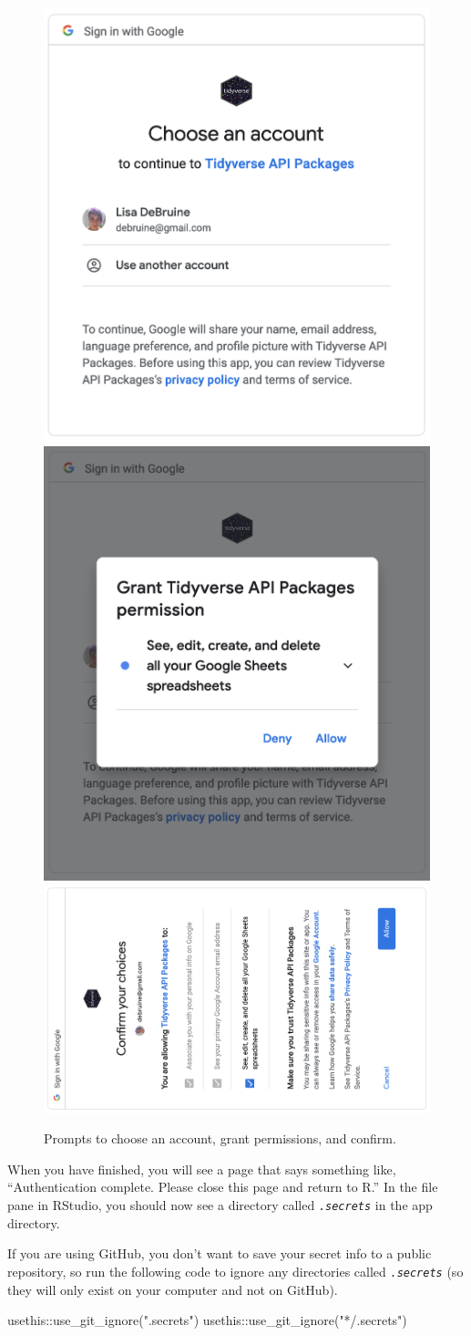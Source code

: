 \documentclass[
  oneside]{book}
\newenvironment{Shaded}{\begin{snugshade}}{\end{snugshade}}
\newcommand{\FunctionTok}[1]{\textcolor[rgb]{0.00,0.00,0.00}{#1}}
\newcommand{\NormalTok}[1]{#1}
\newcommand{\SpecialCharTok}[1]{\textcolor[rgb]{0.00,0.00,0.00}{#1}}
\newcommand{\StringTok}[1]{\textcolor[rgb]{0.31,0.60,0.02}{#1}}
\begin{document}
\begin{figure}

{\centering \includegraphics[width=0.3\linewidth]{images/gs4_choose_account} \includegraphics[width=0.3\linewidth]{images/gs4_auth} \includegraphics[width=0.3\linewidth]{images/gs4_confirm_auth} 

}

\caption{Prompts to choose an account, grant permissions, and confirm.}\label{fig:gs4-auth}
\end{figure}

When you have finished, you will see a page that says something like, ``Authentication complete. Please close this page and return to R.'' In the file pane in RStudio, you should now see a directory called \textit{\texttt{.secrets}} in the app directory.

If you are using GitHub, you don't want to save your secret info to a public repository, so run the following code to ignore any directories called \textit{\texttt{.secrets}} (so they will only exist on your computer and not on GitHub).

\begin{Shaded}
\begin{Highlighting}[]
\NormalTok{usethis}\SpecialCharTok{::}\FunctionTok{use\_git\_ignore}\NormalTok{(}\StringTok{".secrets"}\NormalTok{)}
\NormalTok{usethis}\SpecialCharTok{::}\FunctionTok{use\_git\_ignore}\NormalTok{(}\StringTok{"*/.secrets"}\NormalTok{)}
\end{Highlighting}
\end{Shaded}
\end{document}
